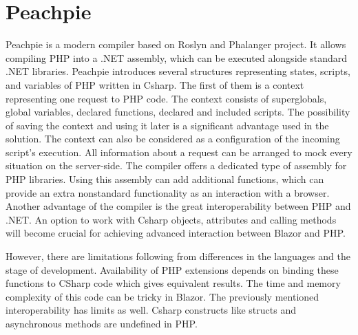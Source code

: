 \section{Peachpie}

Peachpie \cite{16} is a modern compiler based on Roslyn and Phalanger project.
It allows compiling PHP into a .NET assembly, which can be executed alongside standard .NET libraries.
Peachpie introduces several structures representing states, scripts, and variables of PHP written in Csharp.
The first of them is a context representing one request to PHP code.
The context consists of superglobals, global variables, declared functions, declared and included scripts.
The possibility of saving the context and using it later is a significant advantage used in the solution.
The context can also be considered as a configuration of the incoming script's execution.
All information about a request can be arranged to mock every situation on the server-side.
The compiler offers a dedicated type of assembly for PHP libraries.
Using this assembly can add additional functions, which can provide an extra nonstandard functionality as an interaction with a browser.
Another advantage of the compiler is the great interoperability between PHP and .NET.
An option to work with Csharp objects, attributes and calling methods will become crucial for achieving advanced interaction between Blazor and PHP.

However, there are limitations following from differences in the languages and the stage of development.
Availability of PHP extensions depends on binding these functions to CSharp code which gives equivalent results. The time and memory complexity of this code can be tricky in Blazor.
The previously mentioned interoperability has limits as well.
Csharp constructs like structs and asynchronous methods are undefined in PHP.



